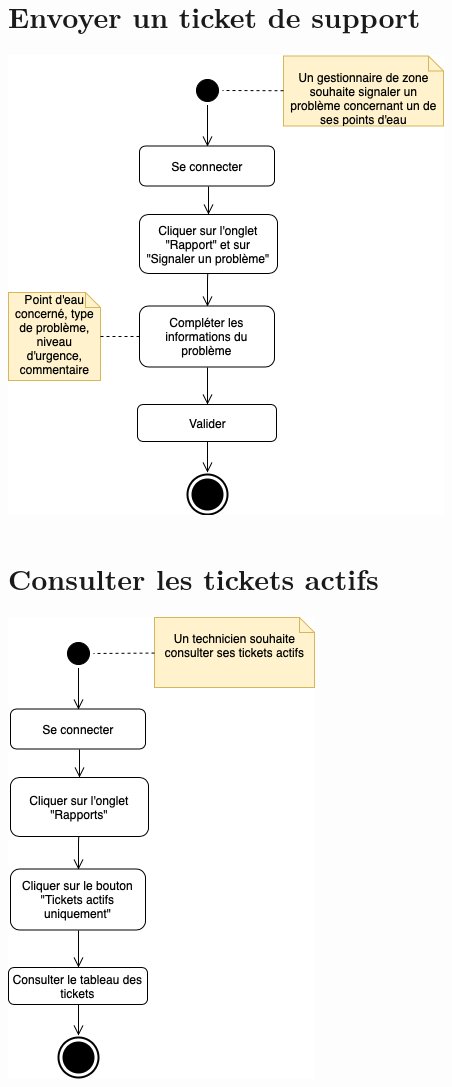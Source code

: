 \documentclass{EPL-master-thesis-covers-FR}
\begin{document}
		\section*{Envoyer un ticket de support}

			\begin{center}
				\includegraphics[scale=.5]{images/activity_ticket}
			\end{center}

		\section*{Consulter les tickets actifs}

			\begin{center}
				\includegraphics[scale=.5]{images/activity_active_tickets}
			\end{center}
\end{document}
